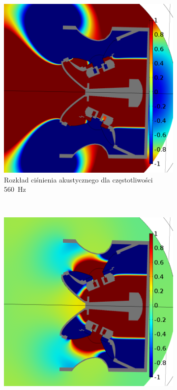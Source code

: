 \documentclass[12pt]{oska}
\begin{document}
\begin{figure}[!ht]
			\begin{subfigure}[b]{.49\textwidth}
			\includegraphics[width=\textwidth]{pres_sig_560Hz.png}
				\caption{Rozkład ciśnienia akustycznego dla częstotliwości \SI{560}{\hertz}}
				\label{r:C_560}
			\end{subfigure}
			~
			\begin{subfigure}[b]{.49\textwidth}
			\includegraphics[width=\textwidth]{pres_sig_710Hz.png}

\end{subfigure}
\end{figure}
\end{document}

